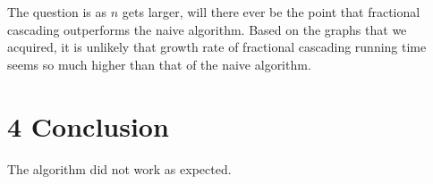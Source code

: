 \documentclass[12pt,english,]{article}
\begin{document}
The question is as $n$ gets larger, will there ever be the point that fractional cascading
outperforms the naive algorithm. Based on the graphs that we acquired, it is unlikely that
growth rate of fractional cascading running time seems so much higher than that of the naive 
algorithm.

\hypertarget{section4}{%
\section{\texorpdfstring{4 \enspace Conclusion}{4 Conclusion}}\label{section4}}

The algorithm did not work as expected.
\end{document}

